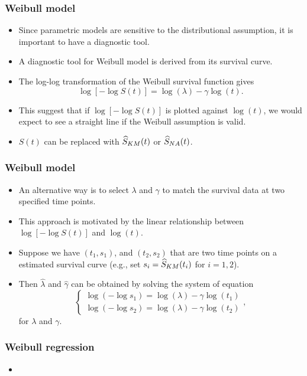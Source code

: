 \documentclass[10pt]{beamer}\usepackage[]{graphicx}\usepackage[]{color}
\newcommand{\Skm}{\widehat{S}_{\scriptsize{KM}}}
\newcommand{\Sna}{\widehat{S}_{\scriptsize{NA}}}
\begin{document}
\begin{frame}
  \frametitle{Weibull model}
  \begin{itemize}
  \item Since parametric models are sensitive to the distributional assumption,
    it is important to have a diagnostic tool.
  \item A diagnostic tool for Weibull model is derived from its survival curve. 
  \item The log-log transformation of the Weibull survival function gives
    $$\log[-\log S(t)] = \log(\lambda) - \gamma\log(t).$$
  \item This suggest that if $\log[-\log S(t)]$ is plotted against $\log(t)$, 
    we would expect to see a straight line if the Weibull assumption is valid. 
  \item $S(t)$ can be replaced with $\Skm(t)$ or $\Sna(t)$.
  \end{itemize}  
\end{frame}

\begin{frame}
  \frametitle{Weibull model}
  \begin{itemize}    
  \item An alternative way is to select $\lambda$ and $\gamma$ to match the
    survival data at two specified time points.
  \item This approach is motivated by the linear relationship between $\log\left[-\log S(t)\right]$
    and $\log(t)$.
  \item Suppose we have $(t_1, s_1)$, and $(t_2, s_2)$ that are two time points on 
    a estimated survival curve (e.g., set $s_i = \Skm(t_i)$ for $i = 1, 2$).
  \item Then $\hat\lambda$ and $\hat\gamma$ can be obtained by solving the system of equation
    $$ \left\{\begin{matrix}
\log\left(-\log s_1\right) = \log(\lambda) - \gamma\log(t_1) \\ 
\log\left(-\log s_2\right) = \log(\lambda) - \gamma\log(t_2)
\end{matrix}\right.,$$
    for $\lambda$ and $\gamma$.
  \end{itemize}  
\end{frame}

\begin{frame}
  \frametitle{Weibull regression}
  \begin{itemize}
  \item 
  \end{itemize}  
\end{frame}
\end{document}
